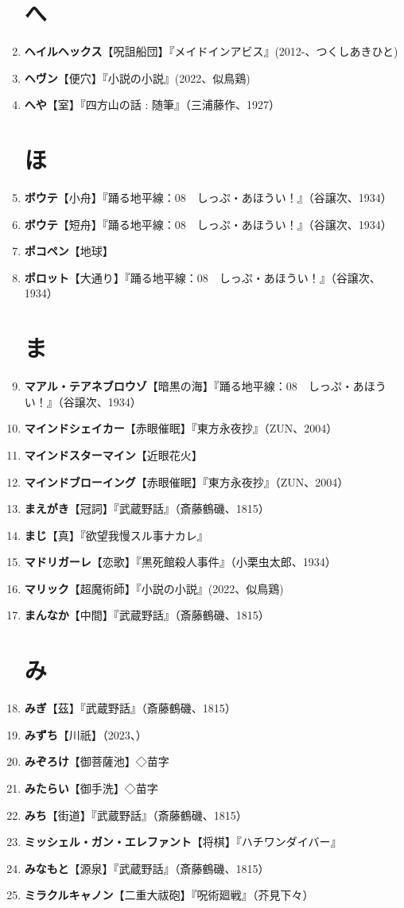 \documentclass[twocolumn]{jsbook}
\begin{document}
\begin{enumerate}
\section*{へ}
    \item \textbf{ヘイルヘックス}【呪詛船団】『メイドインアビス』(2012-、つくしあきひと)
    \item \textbf{ヘヴン}【便穴】『小説の小説』(2022、似鳥鶏)
    \item \textbf{へや}【室】『四方山の話 : 随筆』（三浦藤作、1927）
\section*{ほ}
    \item \textbf{ボウテ}【小舟】『踊る地平線：08　しっぷ・あほうい！』（谷譲次、1934）
    \item \textbf{ボウテ}【短舟】『踊る地平線：08　しっぷ・あほうい！』（谷譲次、1934）
    \item \textbf{ポコペン}【地球】
    \item \textbf{ポロット}【大通り】『踊る地平線：08　しっぷ・あほうい！』（谷譲次、1934）
\section*{ま}
    \item \textbf{マアル・テアネブロウゾ}【暗黒の海】『踊る地平線：08　しっぷ・あほうい！』（谷譲次、1934）
    \item \textbf{マインドシェイカー}【赤眼催眠】『東方永夜抄』（ZUN、2004）
    \item \textbf{マインドスターマイン}【近眼花火】
    \item \textbf{マインドブローイング}【赤眼催眠】『東方永夜抄』（ZUN、2004）
    \item \textbf{まえがき}【冠詞】『武蔵野話』（斎藤鶴磯、1815）
    \item \textbf{まじ}【真】『欲望我慢スル事ナカレ』
    \item \textbf{マドリガーレ}【恋歌】『黒死館殺人事件』（小栗虫太郎、1934）
    \item \textbf{マリック}【超魔術師】『小説の小説』(2022、似鳥鶏)
    \item \textbf{まんなか}【中間】『武蔵野話』（斎藤鶴磯、1815）
\section*{み}
    \item \textbf{みぎ}【茲】『武蔵野話』（斎藤鶴磯、1815）
    \item \textbf{みずち}【川祇】（2023、）
    \item \textbf{みぞろけ}【御菩薩池】◇苗字
    \item \textbf{みたらい}【御手洗】◇苗字
    \item \textbf{みち}【街道】『武蔵野話』（斎藤鶴磯、1815）
    \item \textbf{ミッシェル・ガン・エレファント}【将棋】『ハチワンダイバー』
    \item \textbf{みなもと}【源泉】『武蔵野話』（斎藤鶴磯、1815）
    \item \textbf{ミラクルキャノン}【二重大祓砲】『呪術廻戦』（芥見下々）

\end{enumerate}
\end{document}

